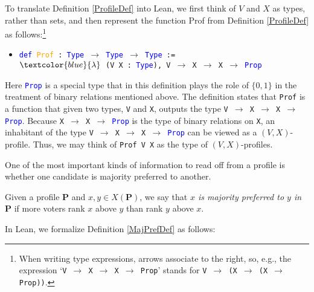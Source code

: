 \documentclass[runningheads]{llncs}
\begin{document}
To translate Definition \ref{ProfileDef} into Lean, we first think of $V$ and $X$ as types, rather than sets, and then represent the function \textsf{Prof} from Definition \ref{ProfileDef} as follows:\footnote{When writing type expressions, arrows associate to the right, so, e.g., the expression  `\texttt{V $\to$ X $\to$ X $\to$ Prop}' stands for \texttt{V $\to$ (X $\to$ (X $\to$ Prop))}.}
\begin{itemize}
\item[] \texttt{\textcolor{blue}{def} \textcolor{orange}{Prof} : \textcolor{blue}{Type} $\to$ \textcolor{blue}{Type} $\to$ \textcolor{blue}{Type} := }\\\texttt{$\textcolor{blue}{\lambda}$ (V X : \textcolor{blue}{Type}), V $\to$ X $\to$ X $\to$ \textcolor{blue}{Prop}}
\end{itemize}
Here \textcolor{blue}{\texttt{Prop}} is a special type that in this definition plays the role of $\{0,1\}$ in the treatment of binary relations mentioned above.  The definition states that \texttt{Prof} is a function that given two types, \texttt{V} and \texttt{X}, outputs the type \texttt{V $\to$ X $\to$ X $\to$ \textcolor{blue}{Prop}}. Because \texttt{X $\to$ X $\to$ \textcolor{blue}{Prop}} is the type of binary relations on \texttt{X}, an inhabitant of the type \texttt{V $\to$ X $\to$ X $\to$ \textcolor{blue}{Prop}} can be viewed as a $(V,X)$-profile. Thus, we may think of \texttt{Prof V X} as the type of $(V,X)$-profiles.

One of the most important kinds of information to read off from a profile is whether one candidate is majority preferred to another.

\begin{definition}\label{MajPrefDef} \textnormal{Given a profile $\mathbf{P}$ and $x,y\in X(\mathbf{P})$, we say that \textit{$x$ is majority preferred to $y$ in $\mathbf{P}$} if more voters rank $x$ above $y$ than rank $y$ above $x$.}\end{definition}

In Lean, we formalize Definition \ref{MajPrefDef} as follows:
\end{document}
